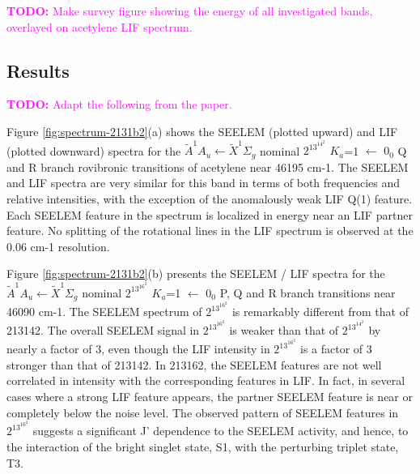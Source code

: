 \documentclass[12pt,draft]{mitthesis}
\newcommand{\TODO} [1]{\textcolor{magenta}{\textbf{TODO:} #1}}
\begin{document}
\TODO{Make survey figure showing the energy of all investigated bands,
  overlayed on acetylene LIF spectrum.}

\subsection{Results}

\TODO{Adapt the following from the paper.}

Figure \ref{fig:spectrum-2131b2}(a) shows the SEELEM (plotted upward)
and LIF (plotted downward) spectra for the $\tilde{A}^1A_u \leftarrow
\tilde{X}^1\Sigma_g$ nominal $2^13^14^2$ $K_a$=1 $\leftarrow$ $0_0$ Q
and R branch rovibronic transitions of acetylene near 46195 cm-1. The
SEELEM and LIF spectra are very similar for this band in terms of both
frequencies and relative intensities, with the exception of the
anomalously weak LIF Q(1) feature. Each SEELEM feature in the spectrum
is localized in energy near an LIF partner feature. No splitting of
the rotational lines in the LIF spectrum is observed at the 0.06 cm-1
resolution.

Figure \ref{fig:spectrum-2131b2}(b) presents the SEELEM / LIF spectra
for the $\tilde{A}^1A_u \leftarrow \tilde{X}^1\Sigma_g$ nominal
$2^13^16^2$ $K_a$=1 $\leftarrow$ $0_0$ P, Q and R branch transitions
near 46090 cm-1. The SEELEM spectrum of $2^13^16^2$ is remarkably different
from that of 213142. The overall SEELEM signal in $2^13^16^2$ is weaker
than that of $2^13^14^2$ by nearly a factor of 3, even though the LIF
intensity in $2^13^16^2$ is a factor of 3 stronger than that of 213142.  In
213162, the SEELEM features are not well correlated in intensity with
the corresponding features in LIF. In fact, in several cases where a
strong LIF feature appears, the partner SEELEM feature is near or
completely below the noise level. The observed pattern of SEELEM
features in $2^13^16^2$ suggests a significant J' dependence to the SEELEM
activity, and hence, to the interaction of the bright singlet state,
S1, with the perturbing triplet state, T3.
\end{document}
